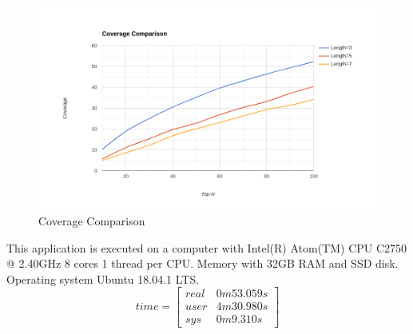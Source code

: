 \begin{figure}[h!]
   \centering
   \includegraphics[width=1\linewidth]{images/coverage-comparison.png}
   \caption{Coverage Comparison}
   \label{fig:coverage-comparison}
\end{figure}

This application is executed on a computer with Intel(R) Atom(TM) CPU  C2750  @ 2.40GHz 8 cores 1 thread per CPU. Memory with 32GB RAM and SSD disk. Operating system Ubuntu 18.04.1 LTS.
\[
time=
  \begin{bmatrix}
    real & 0m53.059s \\
    user & 4m30.980s \\
    sys & 0m9.310s
  \end{bmatrix}
\]